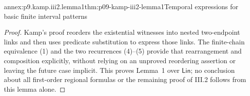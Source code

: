 \begin{annexitem}{annex:p9.kamp.iii2.lemma1}{thm:p09-kamp-iii2-lemma1}{Temporal expressions for basic finite interval patterns}
\begin{proof}
Kamp's proof reorders the existential witnesses into nested two-endpoint
links and then uses predicate substitution to express those links.  The
finite-chain equivalence (1) and the two recurrences (4)--(5) provide that
rearrangement and composition explicitly, without relying on an unproved
reordering assertion or leaving the future case implicit.  This proves
Lemma~1 over \(\mathsf{Lin}\); no conclusion about all first-order
regional formulas or the remaining proof of III.2 follows from this lemma
alone.
\end{proof}
\end{annexitem}
